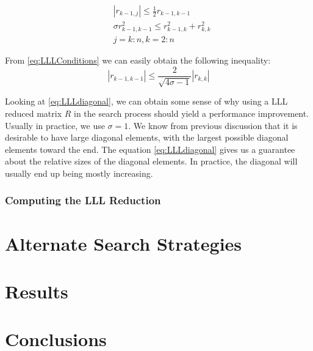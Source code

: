 \documentclass[12pt,Bold,letterpaper]{mcgilletdclass}
\begin{document}
\begin{align} \label{eq:LLLConditions}
&\left | r_{k-1,j} \right | \le \frac{1}{2}r_{k-1,k-1} \\
&\sigma r_{k-1,k-1}^2 \le r_{k-1,k}^2 + r_{k,k}^2 \\
&j = k:n, k=2:n
\end{align}

From \eqref{eq:LLLConditions} we can easily obtain the following inequality:
\begin{equation} \label{eq:LLLdiagonal}
\left | r_{k-1,k-1} \right | \le \frac{2}{\sqrt{4\sigma -1}}\left | r_{k,k} \right |
\end{equation}

Looking at \eqref{eq:LLLdiagonal}, we can obtain some sense of why using a LLL reduced matrix $R$ in the search process should yield a performance improvement. Usually in practice, we use $\sigma=1$. We know from previous discussion that it is desirable to have large diagonal elements, with the largest possible diagonal elements toward the end. The equation \eqref{eq:LLLdiagonal} gives us a guarantee about the relative sizes of the diagonal elements. In practice, the diagonal will usually end up being mostly increasing.

\subsection{Computing the LLL Reduction}


\chapter{Alternate Search Strategies} \label{chap:Searches}

\chapter{Results} \label{chap:Results}

\chapter{Conclusions} \label{chap:Conclusion}






\end{document}
